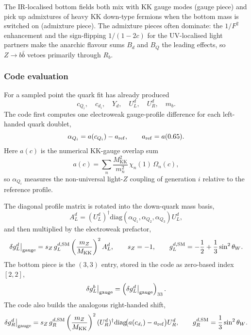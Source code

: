\documentclass[11pt]{article}
\newcommand{\MKK}{M_{\mathrm{KK}}}
\begin{document}
\smallskip
\noindent The IR-localised bottom fields both mix with KK gauge modes (gauge
piece) and pick up admixtures of heavy KK down-type fermions when the bottom mass
is switched on (admixture piece). The admixture pieces often dominate: the
$1/F^2$ enhancement and the sign-flipping $1/(1-2c)$ for the UV-localised light
partners make the anarchic flavour sums $B_d$ and $B_Q$ the leading effects, so
$Z\to b\bar b$ vetoes primarily through $R_b$.

\subsubsection*{Code evaluation}
\noindent For a sampled point the quark fit has already produced
\begin{equation}
c_{Q_i},\quad c_{d_i},\quad Y_d,\quad U_L^d,\quad U_R^d,\quad m_b .
\end{equation}
The code first computes one electroweak gauge-profile difference for each
left-handed quark doublet,
\begin{equation}
\alpha_{Q_i}=a(c_{Q_i})-a_{\rm ref},
\qquad
a_{\rm ref}=a(0.65).
\end{equation}
Here $a(c)$ is the numerical KK-gauge overlap sum
\begin{equation}
a(c)=\sum_n\frac{\MKK^2}{m_n^2}\,\chi_n(1)\,\Omega_n(c),
\end{equation}
so $\alpha_{Q_i}$ measures the non-universal light-$Z$ coupling of generation
$i$ relative to the reference profile.

\smallskip
\noindent The diagonal profile matrix is rotated into the down-quark mass basis,
\begin{equation}
A_L^d=(U_L^d)^\dagger
\mathrm{diag}(\alpha_{Q_1},\alpha_{Q_2},\alpha_{Q_3})U_L^d,
\end{equation}
and then multiplied by the electroweak prefactor,
\begin{equation}
\delta g_L^d\big|_{\rm gauge}
=s_Z\,g_L^{d,{\rm SM}}\left(\frac{m_Z}{\MKK}\right)^2 A_L^d,
\qquad
s_Z=-1,
\qquad
g_L^{d,{\rm SM}}=-\frac12+\frac13\sin^2\theta_W .
\end{equation}
The bottom piece is the $(3,3)$ entry, stored in the code as zero-based
index $[2,2]$,
\begin{equation}
\delta g_L^b\big|_{\rm gauge}
=\left(\delta g_L^d\big|_{\rm gauge}\right)_{33}.
\end{equation}
The code also builds the analogous right-handed shift,
\begin{equation}
\delta g_R^d\big|_{\rm gauge}
=s_Z\,g_R^{d,{\rm SM}}\left(\frac{m_Z}{\MKK}\right)^2
(U_R^d)^\dagger\mathrm{diag}\!\big(a(c_{d_i})-a_{\rm ref}\big)U_R^d,
\qquad
g_R^{d,{\rm SM}}=\frac13\sin^2\theta_W .
\end{equation}
\end{document}

